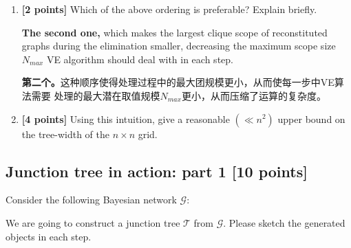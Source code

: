 \documentclass[12pt]{article}
\newcommand{\Gcal}{\mathcal{G}}
\newcommand{\Tcal}{\mathcal{T}}
\begin{document}
\begin{enumerate}
	\item \textbf{[2 points]} Which of the above ordering is preferable? Explain briefly.

	      \begin{solution}
		      \textbf{The second one,} which makes the largest clique scope of reconstituted graphs
		      during the elimination smaller, decreasing the maximum scope size $N_{max}$
		      VE algorithm should deal with in each step.

		      \textbf{第二个。}这种顺序使得处理过程中的最大团规模更小，从而使每一步中VE算法需要
		      处理的最大潜在取值规模$N_{max}$更小，从而压缩了运算的复杂度。
	      \end{solution}

	\item \textbf{[4 points]} Using this intuition, give a reasonable $ (\ll n^2) $ upper bound on the tree-width of the $ n \times n $ grid.



\end{enumerate}

\subsection{Junction tree in action: part 1 [10 points]}



Consider the following Bayesian network $ \Gcal $:
\begin{figure}[h]
	\centering
\end{figure}

We are going to construct a junction tree $ \Tcal $ from $ \Gcal $.
Please sketch the generated objects in each step.
\end{document}
